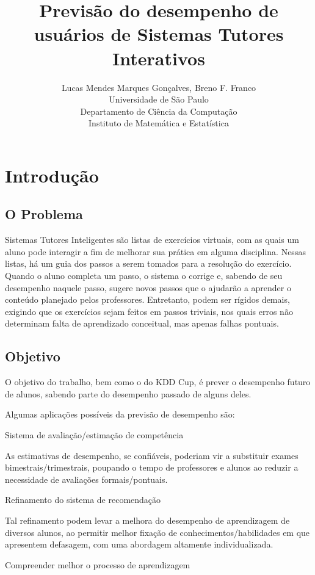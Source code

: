 \documentclass{article}
\title{Previsão do desempenho de usuários de Sistemas Tutores Interativos}
\author{Lucas Mendes Marques Gonçalves, Breno F. Franco\\
  Universidade de São Paulo\\
  Departamento de Ciência da Computação\\
  Instituto de Matemática e Estatística
}
\begin{document}
\maketitle

\tableofcontents


\section{Introdução}
   \subsection{O Problema}

   Sistemas Tutores Inteligentes são listas de exercícios virtuais, com as quais um aluno pode interagir a fim de melhorar sua prática em alguma disciplina. Nessas listas, há um guia dos passos a serem tomados para a resolução do exercício. Quando o aluno completa um passo, o sistema o corrige e, sabendo de seu desempenho naquele passo, sugere novos passos que o ajudarão a aprender o conteúdo planejado pelos professores. Entretanto, podem ser rígidos demais, exigindo que os exercícios sejam feitos em passos triviais, nos quais erros não determinam falta de aprendizado conceitual, mas apenas falhas pontuais.

   \subsection{Objetivo}
      O objetivo do trabalho, bem como o do KDD Cup, é prever o desempenho futuro de alunos, sabendo parte do desempenho passado de alguns deles.

      Algumas aplicações possíveis da previsão de desempenho são:
          
      Sistema de avaliação/estimação de competência

         As estimativas de desempenho, se confiáveis, poderiam vir a substituir exames bimestrais/trimestrais, poupando o tempo de professores e alunos ao reduzir a necessidade de avaliações formais/pontuais.

      Refinamento do sistema de recomendação
         
         Tal refinamento podem levar a melhora do desempenho de aprendizagem de diversos alunos, ao permitir melhor fixação de conhecimentos/habilidades em que apresentem defasagem, com uma abordagem altamente individualizada.

      Compreender melhor o processo de aprendizagem
\end{document}
